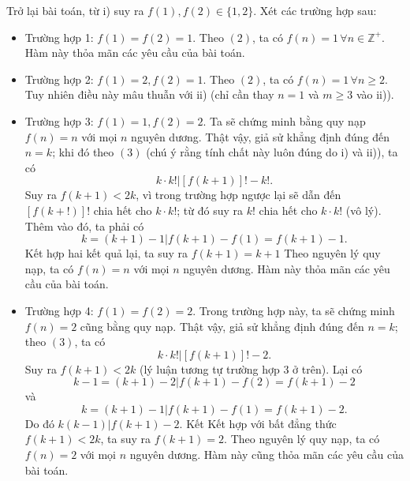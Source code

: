 \begin{bt}[BMO, 2010]
{\begin{nx}
			Trở lại bài toán, từ i) suy ra $f(1), f(2) \in \{1,2\}$. Xét các trường hợp sau:
			\begin{itemize}
				\item Trường hợp 1: $f(1)=f(2)=1$. Theo $(2)$, ta có $f(n)=1 \, \forall n \in \mathbb{Z}^+$. Hàm này thỏa mãn các yêu cầu của bài toán.
				\item Trường hợp 2: $f(1)=2, f(2)=1.$ Theo $(2)$, ta có $f(n)=1\, \forall n \geq 2$. Tuy nhiên điều này mâu thuẫn với ii) (chỉ cần thay $n=1$ và $m \geq 3$ vào ii)).
				\item Trường hợp 3: $f(1)=1, f(2)=2$. Ta sẽ chứng minh bằng quy nạp $f(n)=n$ với mọi $n$ nguyên dương. Thật vậy, giả sử khẳng định đúng đến $n=k$; khi đó theo $(3)$ (chú ý rằng tính chất này luôn đúng do i) và ii)), ta có
				\[k\cdot k!| \left[f(k+1)\right]!-k!. \]
				Suy ra $f(k+1)< 2k$, vì trong trường hợp ngược lại sẽ dẫn đến $\left[ f(k+!)\right]!$ chia hết cho $k \cdot k!$; từ đó suy ra $k!$ chia hết cho $k\cdot k!$ (vô lý). Thêm vào đó, ta phải có \[ k=(k+1)-1|f(k+1)-f(1)=f(k+1)-1. \]
				Kết hợp hai kết quả lại, ta suy ra $f(k+1)=k+1$ Theo nguyên lý quy nạp, ta có
				$f(n)= n$ với mọi $n$ nguyên dương. Hàm này thỏa mãn các yêu cầu của bài toán.
				\item Trường hợp 4: $f(1)=f(2)=2$. Trong trường hợp này, ta sẽ chứng minh $f(n)=2$
				cũng bằng quy nạp. Thật vậy, giả sử khẳng định đúng đến $n=k$; theo $(3)$, ta có
				\[ k\cdot k! | \left[f(k+1)\right]!-2. \]
				Suy ra $f(k+1)<2k$ (lý luận tương tự trường hợp 3 ở trên). Lại có
				\[k-1= (k+1)-2|f(k+1)-f(2)=f(k+1)-2  \]
				và \[ k=(k+1)-1|f(k+1)-f(1)=f(k+1)-2. \]
				Do đó $k(k-1)|f(k+1)-2.$ Kết  Kết hợp với bất đẳng thức $f(k+1)< 2k$, ta suy ra
				$f(k+1)=2$. Theo nguyên lý quy nạp, ta có $f(n)=2$ với mọi $n$ nguyên dương. Hàm
				này cũng thỏa mãn các yêu cầu của bài toán.
			\end{itemize}
		\end{nx}
	}
\end{bt}

